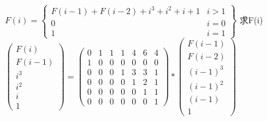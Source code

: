 \indent
$F(i) = \begin{Bmatrix}F(i-1)+F(i-2)+i^3+i^2+i+1&i > 1\\0&i=0\\1&i=1\end{Bmatrix}$  求F(i)
\indent
$\begin{pmatrix}F(i)\\F(i-1)\\i^3\\i^2\\i\\1\end{pmatrix} = \begin{pmatrix}0&1&1&1&4&6&4\\1&0&0&0&0&0&0\\0&0&0&1&3&3&1\\0&0&0&0&1&2&1\\0&0&0&0&0&1&1\\0&0&0&0&0&0&1\end{pmatrix}*\begin{pmatrix}F(i-1)\\F(i-2)\\(i-1)^3\\(i-1)^2\\(i-1)\\1\end{pmatrix}$